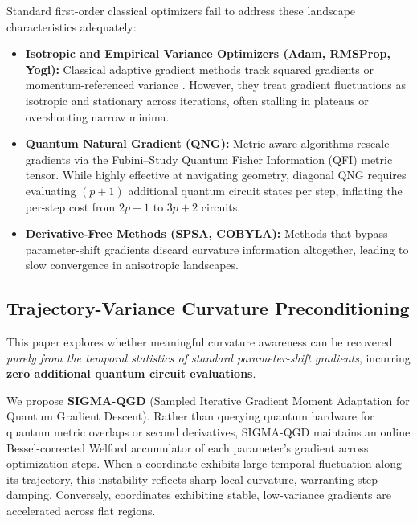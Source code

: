 \documentclass[11pt,a4paper]{article}
\begin{document}
Standard first-order classical optimizers fail to address these landscape characteristics adequately:
\begin{itemize}
    \item \textbf{Isotropic and Empirical Variance Optimizers (Adam, RMSProp, Yogi):} Classical adaptive gradient methods \cite{kingma2014adam,tieleman2012lecture,zaheer2018adaptive} track squared gradients or momentum-referenced variance \cite{zhuang2020adabelief}. However, they treat gradient fluctuations as isotropic and stationary across iterations, often stalling in plateaus or overshooting narrow minima.
    \item \textbf{Quantum Natural Gradient (QNG):} Metric-aware algorithms \cite{stokes2020quantum,wierichs2020avoiding} rescale gradients via the Fubini--Study Quantum Fisher Information (QFI) metric tensor. While highly effective at navigating geometry, diagonal QNG requires evaluating $(p+1)$ additional quantum circuit states per step, inflating the per-step cost from $2p+1$ to $3p+2$ circuits.
    \item \textbf{Derivative-Free Methods (SPSA, COBYLA):} Methods that bypass parameter-shift gradients \cite{spall1992multivariate,novak2025benchmarking} discard curvature information altogether, leading to slow convergence in anisotropic landscapes.
\end{itemize}

\subsection{Trajectory-Variance Curvature Preconditioning}
This paper explores whether meaningful curvature awareness can be recovered \emph{purely from the temporal statistics of standard parameter-shift gradients}, incurring \textbf{zero additional quantum circuit evaluations}. 

We propose \textbf{SIGMA-QGD} (Sampled Iterative Gradient Moment Adaptation for Quantum Gradient Descent). Rather than querying quantum hardware for quantum metric overlaps or second derivatives, SIGMA-QGD maintains an online Bessel-corrected Welford accumulator of each parameter's gradient across optimization steps. When a coordinate exhibits large temporal fluctuation along its trajectory, this instability reflects sharp local curvature, warranting step damping. Conversely, coordinates exhibiting stable, low-variance gradients are accelerated across flat regions.
\end{document}
